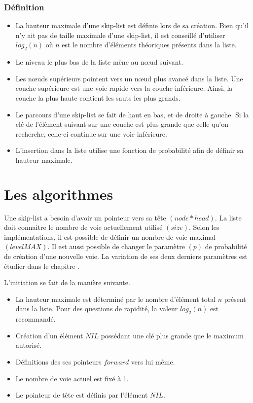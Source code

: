 \documentclass[hidelinks,a4paper, 12pt]{article}
\begin{document}
	\subsubsection*{Définition}
	\begin{itemize}
		\item La hauteur maximale d'une skip-list est définie lors de sa création. Bien qu'il n'y ait pas de taille maximale d'une skip-list, il est conseillé d'utiliser $log_2(n)$ où $n$ est le nombre d'éléments théoriques présents dans la liste. 
		\item Le niveau le plus bas de la liste mène au nœud suivant. 
		\item Les nœuds supérieurs pointent vers un nœud plus avancé dans la liste.  Une couche supérieure est une voie rapide vers la couche inférieure. Ainsi, la couche la plus haute contient les sauts les plus grands.
		\item Le parcours d'une skip-list se fait de haut en bas, et de droite à gauche. Si la clé de l'élément suivant sur une couche est plus grande que celle qu'on recherche, celle-ci continue sur une voie inférieure.
		\item L'insertion dans la liste utilise une fonction de probabilité afin de définir sa hauteur maximale.
	\end{itemize}
	
	\section{Les algorithmes}
	Une skip-list a besoin d'avoir un pointeur vers sa tête $(node* head)$. La liste doit connaitre le nombre de voie actuellement utilisé $(size)$. Selon les implémentations, il est possible de définir un nombre de voie maximal $(levelMAX)$. Il est aussi possible de changer le paramètre $(p)$ de probabilité de création d'une nouvelle voie. La variation de ses deux derniers paramètres est étudier dans le chapitre .
	
	
	L'initiation se fait de la manière suivante.
	\begin{itemize}
		\item La hauteur maximale est déterminé par le nombre d'élément total $n$ présent dans la liste. Pour des questions de rapidité, la valeur $log_2(n)$ est recommandé.
		\item Création d'un élément $NIL$ possédant une clé plus grande que le maximum autorisé.
		\item Définitions des ses pointeurs $forward$ vers lui même.
		\item Le nombre de voie actuel est fixé à 1.
		\item Le pointeur de tête est définis par l'élément $NIL$.
	\end{itemize}
	
	
\end{document}
